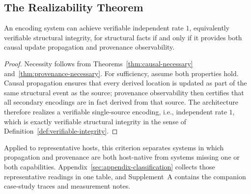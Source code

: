 \subsection{The Realizability Theorem}\label{sec:realizability-theorem}

\begin{corollary}\label{thm:ssot-iff}
An encoding system can achieve verifiable independent rate $1$, equivalently verifiable structural integrity, for structural facts if and only if it provides both causal update propagation and provenance observability.
\end{corollary}

\begin{proof}
Necessity follows from Theorems~\ref{thm:causal-necessary} and~\ref{thm:provenance-necessary}. For sufficiency, assume both properties hold. Causal propagation ensures that every derived location is updated as part of the same structural event as the source; provenance observability then certifies that all secondary encodings are in fact derived from that source. The architecture therefore realizes a verifiable single-source encoding, i.e., independent rate $1$, which is exactly verifiable structural integrity in the sense of Definition~\ref{def:verifiable-integrity}.
\end{proof}

Applied to representative hosts, this criterion separates systems in which propagation and provenance are both host-native from systems missing one or both capabilities. Appendix~\ref{sec:appendix-classification} collects those representative readings in one table, and Supplement~A contains the companion case-study traces and measurement notes.

